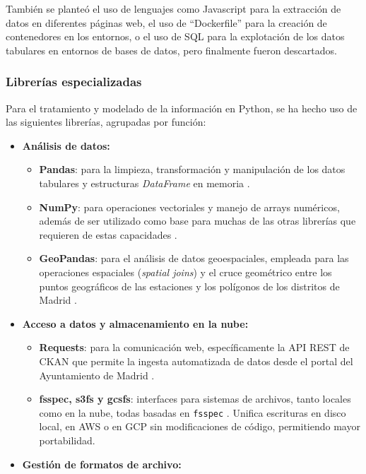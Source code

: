 También se planteó el uso de lenguajes como Javascript para la extracción de datos en diferentes páginas web, el uso de ``Dockerfile'' para la creación de contenedores en los entornos, o el uso de SQL para la explotación de los datos tabulares en entornos de bases de datos, pero finalmente fueron descartados.

\subsubsection*{Librerías especializadas} \label{sec:Librerias_especializadas}

Para el tratamiento y modelado de la información en Python, se ha hecho uso de las siguientes librerías, agrupadas por función:

\begin{itemize}
	\item \textbf{Análisis de datos:}
	\begin{itemize}
		\item \textbf{Pandas}: para la limpieza, transformación y manipulación de los datos tabulares y estructuras \textit{DataFrame} en memoria \citep{Pandas2026}.
		\item \textbf{NumPy}: para operaciones vectoriales y manejo de arrays numéricos, además de ser utilizado como base para muchas de las otras librerías que requieren de estas capacidades \citep{NumPy2026}.
		\item \textbf{GeoPandas}: para el análisis de datos geoespaciales, empleada para las operaciones espaciales (\textit{spatial joins}) y el cruce geométrico entre los puntos geográficos de las estaciones y los polígonos de los distritos de Madrid \citep{geopandas2026}.
	\end{itemize}
	\item \textbf{Acceso a datos y almacenamiento en la nube:}
	\begin{itemize}
		\item \textbf{Requests}: para la comunicación web, específicamente la API REST de CKAN que permite la ingesta automatizada de datos desde el portal del Ayuntamiento de Madrid \citep{Requests2026}.
		\item \textbf{fsspec, s3fs y gcsfs}: interfaces para sistemas de archivos, tanto locales como en la nube, todas basadas en \texttt{fsspec} \citep{fsspec2024}. Unifica escrituras en disco local, en AWS o en GCP sin modificaciones de código, permitiendo mayor portabilidad.
	\end{itemize}
	\item \textbf{Gestión de formatos de archivo:}

\end{itemize}
